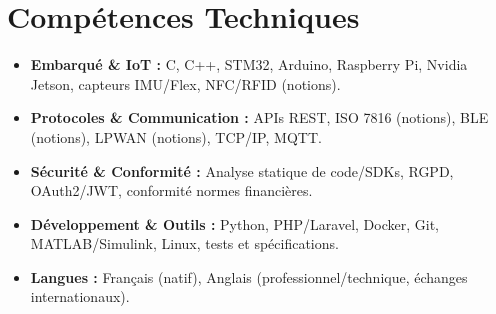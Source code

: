 \documentclass[a4paper,11pt]{article}
\begin{document}
\section{Compétences Techniques}
\begin{itemize}[leftmargin=*, nosep]
    \item \small{\textbf{Embarqué \& IoT :} C, C++, STM32, Arduino, Raspberry Pi, Nvidia Jetson, capteurs IMU/Flex, NFC/RFID (notions).}
    \item \small{\textbf{Protocoles \& Communication :} APIs REST, ISO 7816 (notions), BLE (notions), LPWAN (notions), TCP/IP, MQTT.}
    \item \small{\textbf{Sécurité \& Conformité :} Analyse statique de code/SDKs, RGPD, OAuth2/JWT, conformité normes financières.}
    \item \small{\textbf{Développement \& Outils :} Python, PHP/Laravel, Docker, Git, MATLAB/Simulink, Linux, tests et spécifications.}
    \item \small{\textbf{Langues :} Français (natif), Anglais (professionnel/technique, échanges internationaux).}
\end{itemize}

\end{document}
